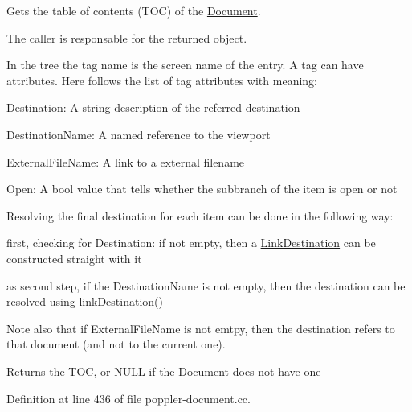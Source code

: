 Gets the table of contents (T\+OC) of the \hyperlink{class_poppler_1_1_document}{Document}.

The caller is responsable for the returned object.

In the tree the tag name is the \textquotesingle{}screen\textquotesingle{} name of the entry. A tag can have attributes. Here follows the list of tag attributes with meaning\+:
\begin{DoxyItemize}
\item Destination\+: A string description of the referred destination
\item Destination\+Name\+: A \textquotesingle{}named reference\textquotesingle{} to the viewport
\item External\+File\+Name\+: A link to a external filename
\item Open\+: A bool value that tells whether the subbranch of the item is open or not
\end{DoxyItemize}

Resolving the final destination for each item can be done in the following way\+:
\begin{DoxyItemize}
\item first, checking for \textquotesingle{}Destination\textquotesingle{}\+: if not empty, then a \hyperlink{class_poppler_1_1_link_destination}{Link\+Destination} can be constructed straight with it
\item as second step, if the \textquotesingle{}Destination\+Name\textquotesingle{} is not empty, then the destination can be resolved using \hyperlink{class_poppler_1_1_document_adce7c161b57d9d8a89888697da1d8c90}{link\+Destination()}
\end{DoxyItemize}

Note also that if \textquotesingle{}External\+File\+Name\textquotesingle{} is not emtpy, then the destination refers to that document (and not to the current one).

\begin{DoxyReturn}{Returns}
the T\+OC, or N\+U\+LL if the \hyperlink{class_poppler_1_1_document}{Document} does not have one 
\end{DoxyReturn}


Definition at line 436 of file poppler-\/document.\+cc.

\mbox{\label{class_poppler_1_1_document_a5eb83ee712c9e146ccbcb21c3a9ce662}} 
